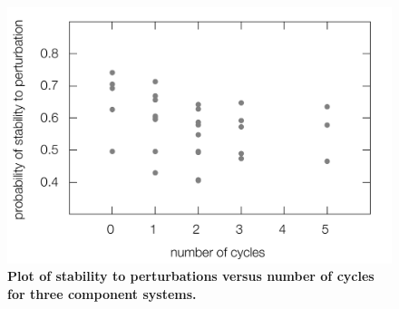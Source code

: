 \begin{figure}[!ht]
\centering
\noindent\includegraphics[width=0.8\columnwidth]{fig/cycle3x3.pdf}
\caption{{\bf Plot of stability to perturbations versus number of cycles for three component systems.} }
\label{fig:cycle3x3}
\end{figure}
